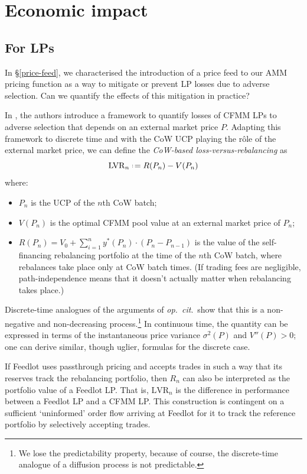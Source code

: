 \documentclass[a4paper,10pt]{article}
\theoremstyle{remark}
\newcommand{\defeq}{\mathrel{\vcenter{\hbox{\scriptsize:}}\!=}} %
\begin{document}
\section{Economic impact}
\label{impact}

\subsection{For LPs}
In \S\ref{price-feed}, we characterised the introduction of a price feed to our AMM pricing function as a way to mitigate or prevent LP losses due to adverse selection.
%
Can we quantify the effects of this mitigation in practice?

In \cite{milionis2022automated}, the authors introduce a framework to quantify losses of CFMM LPs to adverse selection that depends on an external market price $P$.
%
Adapting this framework to discrete time and with the CoW UCP playing the r\^ole of the external market price, we can define the \emph{CoW-based loss-versus-rebalancing} as
\[
  \mathrm{LVR}_n \defeq R(P_n) - V(P_n)
\]
where:
\begin{itemize}
  \item $P_n$ is the UCP of the $n$th CoW batch;
  \item $V(P_n)$ is the optimal CFMM pool value at an external market price of $P_n$;
  \item 
    $R(P_n) = V_0 + \sum_{i=1}^n y^*(P_n)\cdot (P_n-P_{n-1})$ is the value of the self-financing rebalancing portfolio at the time of the $n$th CoW batch, where rebalances take place only at CoW batch times.
    (If trading fees are negligible, path-independence means that it doesn't actually matter when rebalancing takes place.)
    
\end{itemize}
Discrete-time analogues of the arguments of \emph{op.~cit}.~show that this is a non-negative and non-decreasing process.\footnote{We lose the predictability property, because of course, the discrete-time analogue of a diffusion process is not predictable.} 
%
In continuous time, the quantity can be expressed in terms of the instantaneous price variance $\sigma^2(P)$ and $V''(P)>0$; one can derive similar, though uglier, formulas for the discrete case.

If Feedlot uses passthrough pricing and accepts trades in such a way that its reserves track the rebalancing portfolio, then $R_n$ can also be interpreted as the portfolio value of a Feedlot LP.
%
That is, $\mathrm{LVR}_n$ is the difference in performance between a Feedlot LP and a CFMM LP.
%
This construction is contingent on a sufficient `uninformed' order flow arriving at Feedlot for it to track the reference portfolio by selectively accepting trades.
%
\end{document}

